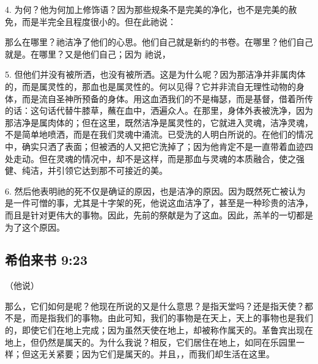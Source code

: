 4.  为何？他为何加上修饰语？因为那些规条不是完美的净化，也不是完美的赦免，而是半完全且程度很小的。但在此祂说： \par

那么在哪里？祂洁净了他们的心思。他们自己就是新约的书卷。在哪里？他们自己就是。在哪里？又是他们自己；因为 祂说， \par

5. 但他们并没有被所洒，也没有被所洒。这是为什么呢？因为那洁净并非属肉体的，而是属灵性的，那血也是属灵性的。何以见得？它并非流自无理性动物的身体，而是流自圣神所预备的身体。用这血洒我们的不是梅瑟，而是基督，借着所传的话：这句话代替牛膝草，蘸在血中，洒遍众人。在那里，身体外表被洗净，因为那洁净是属肉体的；但在这里，既然洁净是属灵性的，它就进入灵魂，洁净灵魂，不是简单地喷洒，而是在我们灵魂中涌流。已受洗的人明白所说的。在他们的情况中，确实只洒了表面；但被洒的人又把它洗掉了；因为他肯定不是一直带着血迹四处走动。但在灵魂的情况中，却不是这样，而是那血与灵魂的本质融合，使之强健、纯洁，并引领它达到那不可接近的美。\par

6. 然后他表明祂的死不仅是确证的原因，也是洁净的原因。因为既然死亡被认为是一件可憎的事，尤其是十字架的死，他说这血洁净了，甚至是一种珍贵的洁净，而且是针对更伟大的事物。因此，先前的祭献是为了这血。因此，羔羊的一切都是为了这个原因。\par


\subsection{希伯来书 9:23}

（他说）\par

那么，它们如何是呢？他现在所说的又是什么意思？是指天堂吗？还是指天使？都不是，而是指我们的事物。由此可知，我们的事物是在天上，天上的事物也是我们的，即使它们在地上完成；因为虽然天使在地上，却被称作属天的。革鲁宾出现在地上，但仍然是属天的。为什么我说？相反，它们居住在地上，如同在乐园里一样；但这无关紧要；因为它们是属天的。并且，，而我们却生活在这里。\par

